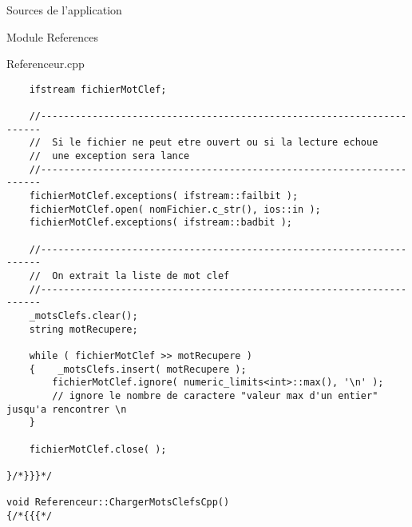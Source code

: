 \documentclass{article}
\begin{document}
\begin{section}{Sources de l'application}
\begin{subsection}{Module References}
\begin{paragraph}{Referenceur.cpp}
\begin{verbatim}
    ifstream fichierMotClef;

    //----------------------------------------------------------------------
    //  Si le fichier ne peut etre ouvert ou si la lecture echoue
    //  une exception sera lance
    //----------------------------------------------------------------------
    fichierMotClef.exceptions( ifstream::failbit );
    fichierMotClef.open( nomFichier.c_str(), ios::in );
    fichierMotClef.exceptions( ifstream::badbit );

    //----------------------------------------------------------------------
    //  On extrait la liste de mot clef
    //----------------------------------------------------------------------
    _motsClefs.clear();
    string motRecupere;

    while ( fichierMotClef >> motRecupere ) 
    {    _motsClefs.insert( motRecupere );
        fichierMotClef.ignore( numeric_limits<int>::max(), '\n' );
        // ignore le nombre de caractere "valeur max d'un entier" jusqu'a rencontrer \n
    }

    fichierMotClef.close( );

}/*}}}*/

void Referenceur::ChargerMotsClefsCpp()
{/*{{{*/


\end{verbatim}
\end{paragraph}
\end{subsection}
\end{section}
\end{document}
